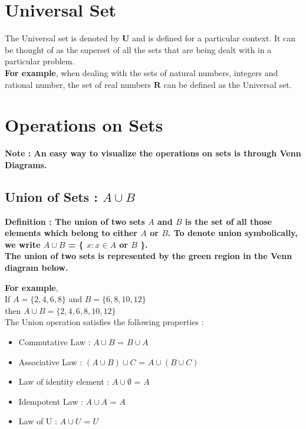 \documentclass[12pt, letterpaper]{article}
\begin{document}
\section{Universal Set}
The Universal set is denoted by $\mathbf{U}$ and is defined for a particular context. It can be thought of as the superset of all the sets that are being dealt with in a particular problem.\\
\textbf{For example}, when dealing with the sets of natural numbers, integers and rational number, the set of real numbers $\mathbf{R}$ can be defined as the Universal set.


\section{Operations on Sets}
\textbf{Note : An easy way to visualize the operations on sets is through Venn Diagrams.}

\subsection{Union of Sets : $A \cup B$}
\begin{displayquote}
\textbf{Definition : The union of two sets $A$ and $B$ is the set of all those elements which belong to either $A$ or $B$. To denote union symbolically, we write $A \cup B$ = \{ $x : x \in A$ or $B$ \}.\\ 
The union of two sets is represented by the green region in the Venn diagram below.}
\end{displayquote}
\begin{center}
\end{center}
\textbf{For example},\\ 
If $A = \{2,4,6,8\}$ and $B = \{6,8,10,12\}$ \\
then $A \cup B = \{2,4,6,8,10,12\}$\\
The Union operation satisfies the following properties : 
\begin{itemize}
    \item Commutative Law : $A \cup B$ = $B \cup A$
    \item Associative Law : $(A \cup B) \cup C$ = $A \cup (B \cup C)$
    \item Law of identity element : $A \cup \emptyset$ = $A$ 
    \item Idempotent Law : $A \cup A$ = $A$
    \item Law of U : $A \cup U$ = $U$
\end{itemize}
\end{document}
